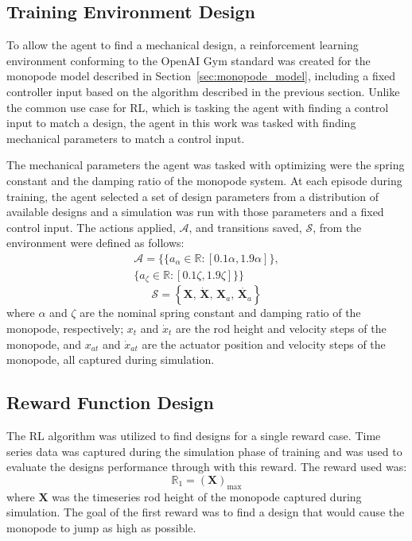 \documentclass[10pt,twocolumn,letterpaper]{article}
\begin{document}
\subsection{Training Environment Design}
%
To allow the agent to find a mechanical design, a reinforcement learning environment conforming to the OpenAI Gym standard \cite{Brockman2016c} was created for the monopode model described in Section~\ref{sec:monopode_model}, including a fixed controller input based on the algorithm described in the previous section. Unlike the common use case for RL, which is tasking the agent with finding a control input to match a design, the agent in this work was tasked with finding mechanical parameters to match a control input.

The mechanical parameters the agent was tasked with optimizing were the spring constant and the damping ratio of the monopode system. At each episode during training, the agent selected a set of design parameters from a distribution of available designs and a simulation was run with those parameters and a fixed control input. The actions applied, $\mathcal{A}$, and transitions saved, $\mathcal{S}$, from the environment were defined as follows:
%
\begin{equation}
        \label{eq:action}
        \begin{aligned}
        \mathcal{A} = \{ \{ a_{\alpha} \in \mathbb{R}: [0.1 \alpha, 1.9 \alpha] \}, \\ 
        \{ a_{\zeta} \in \mathbb{R}: [0.1 \zeta, 1.9 \zeta] \} \}
        \end{aligned}
\end{equation} 
%
\begin{equation}
        \label{eq:transitions}
        \mathcal{S}= \left \{ \textbf{X}, \, \dot{\textbf{X}}, \, \textbf{X}_a, \, \dot{\textbf{X}_a}  \right \}
\end{equation}
%
where $\alpha$ and $\zeta$ are the nominal spring constant and damping ratio of the monopode, respectively; $x_t$ and $\dot{x}_t$ are the rod height and velocity steps of the monopode, and $x_{at}$ and $\dot{x}_{at}$ are the actuator position and velocity steps of the monopode, all captured during simulation. 

\subsection{Reward Function Design}

The RL algorithm was utilized to find designs for a single reward case. Time series data was captured during the simulation phase of training and was used to evaluate the designs performance through with this reward. The reward used was:
%
\begin{equation}
        \mathbb{R}_1 = \left (\textbf{X}  \right )_{\text{max}}
\end{equation}
% 
where $\textbf{X}$ was the timeseries rod height of the monopode captured during simulation. The goal of the first reward was to find a design that would cause the monopode to jump as high as possible. 
\end{document}
